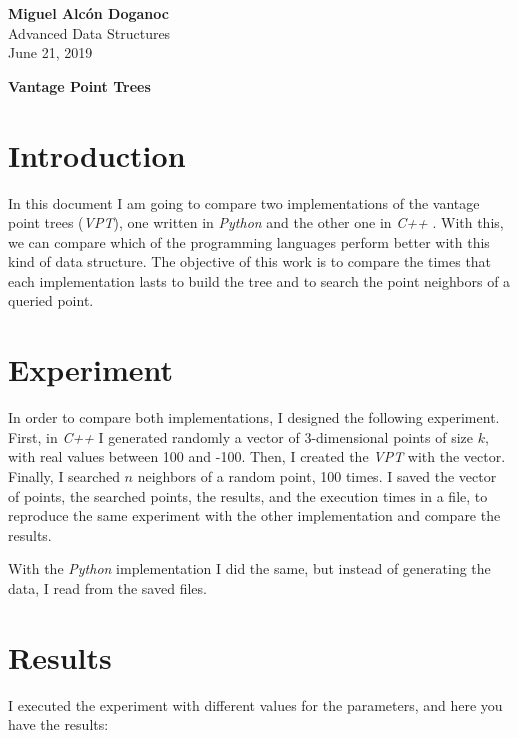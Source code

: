 \documentclass[a4paper, 10pt]{article}
\begin{document}
\noindent
\begin{flushright}
    \large\textbf{Miguel Alcón Doganoc} \\
    Advanced Data Structures \\
	June 21, 2019
\end{flushright}

\noindent
{\huge{\textbf{Vantage Point Trees}}}

\section*{Introduction}
In this document I am going to compare two implementations of the vantage point trees (\textit{VPT}), one written in \textit{Python} \cite{python} and the other one in \textit{C++} \cite{cpp}. With this, we can compare which of the programming languages perform better with this kind of data structure. The objective of this work is to compare the times that each implementation lasts to build the tree and to search the point neighbors of a queried point.

\section*{Experiment}
In order to compare both implementations, I designed the following experiment. First, in \textit{C++} I generated randomly a vector of 3-dimensional points of size $k$, with real values between 100 and -100. Then, I created the \textit{VPT} with the vector. Finally, I searched $n$ neighbors of a random point, 100 times. I saved the vector of points, the searched points, the results, and the execution times in a file, to reproduce the same experiment with the other implementation and compare the results.

With the \textit{Python} implementation I did the same, but instead of generating the data, I read from the saved files.

\section*{Results}
I executed the experiment with different values for the parameters, and here you have the results:
\end{document}
